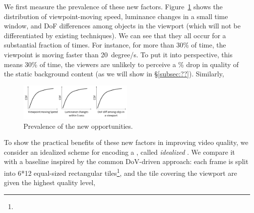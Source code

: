 We first measure the prevalence of these new factors. 
Figure~\ref{fig:prevalence} shows the distribution of viewpoint-moving speed, luminance changes in a small time window, and DoF differences among objects in the viewport (which will not be differentiated by existing techniques).
We can see that they all occur for a substantial fraction of times. 
For instance, for more than 30\% of time, the viewpoint is moving faster than 20~degree/s. 
To put it into perspective, this means 30\% of time, the viewers are unlikely to perceive a \fillme\% drop in quality of the static background content (as we will show in \S\ref{subsec:??}).
Similarly, 



\begin{figure}
  \centering
  \includegraphics[width=0.5\textwidth]{figures/prevalence.pdf}
  \caption{Prevalence of the new opportunities.}
  \label{fig:prevalence}
 \end{figure}



To show the practical benefits of these new factors in improving video quality, we consider an idealized scheme for encoding a \vrvideo, called {\em idealized \vrvideo}.
We compare it with a baseline inspired by the common DoV-driven approach: each frame is split into 
6*12 equal-sized rectangular tiles\footnote{}, and the tile covering the viewport are given the highest quality level, 


